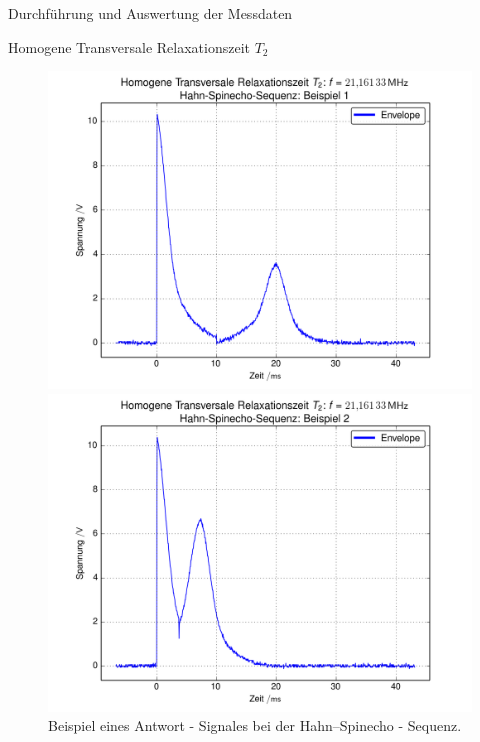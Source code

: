 \documentclass[pdftex, a4paper,11pt, twoside, ngerman]{report}
\begin{document}
\begin{chapter}{Durchführung und Auswertung der Messdaten}
\begin{section}{
        Homogene Transversale Relaxationszeit $T_{2}$}
\begin{subsection}
\begin{figure}[htb]
\begin{minipage}{.48\textwidth}
            \includegraphics[width=\textwidth]
            {Figures/HomoTransRelax_Hahn_beispiel0.png}
            \caption{Beispiel eines Antwort - Signales bei der
              Hahn--Spinecho - Sequenz.}
            \label{figHahnBsp1}
          \end{minipage}\quad
          \begin{minipage}{.48\textwidth}
            \centering
            \includegraphics[width=\textwidth]
            {Figures/HomoTransRelax_Hahn_beispiel1.png}
            \caption{Beispiel eines Antwort - Signales bei der
              Hahn--Spinecho - Sequenz.}
            \label{figHahnBsp2}
          \end{minipage}
        \end{figure}
        

\end{subsection}
\end{section}
\end{chapter}
\end{document}
